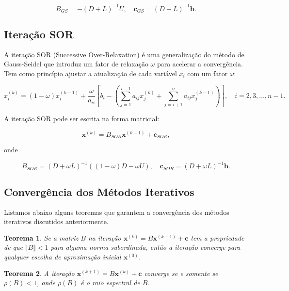 \documentclass{article}
\theoremstyle{plain}
\newtheorem{thm}{Teorema}[section]
\theoremstyle{definition}
\theoremstyle{remark}
\begin{document}
\begin{equation}
  B_{GS} = -(D + L)^{-1}U, \quad \mathbf{c}_{GS} = (D + L)^{-1}\mathbf{b}.
\end{equation}

\subsection{Iteração SOR}

A iteração SOR (Successive Over-Relaxation) é uma generalização do método de Gauss-Seidel que introduz um fator de relaxação \(\omega\) para acelerar a convergência. Tem como princípio ajustar a atualização de cada variável \(x_i\) com um fator \(\omega\):

\begin{equation}
  x_i^{(k)} = (1 - \omega)x_i^{(k-1)} + \frac{\omega}{a_{ii}} \left[ b_i - \left(\sum_{j=1}^{i-1} a_{ij} x_j^{(k)} + \sum_{j=i+1}^{n} a_{ij} x_j^{(k-1)}\right)\right], \quad i = 2, 3, \ldots, n-1.
\end{equation}

\noindent A iteração SOR pode ser escrita na forma matricial:

\begin{equation}
  \mathbf{x}^{(k)} = B_{SOR}\mathbf{x}^{(k-1)} + \mathbf{c}_{SOR},
\end{equation}

\noindent onde

\begin{equation}
  B_{SOR} = (D + \omega L)^{-1}((1 - \omega)D - \omega U), \quad \mathbf{c}_{SOR} = (D + \omega L)^{-1}\mathbf{b}.
\end{equation}

\subsection{Convergência dos Métodos Iterativos}

Listamos abaixo alguns teoremas que garantem a convergência dos métodos iterativos discutidos anteriormente.

\begin{thm}
  Se a matriz \(B\) na iteração \(\mathbf{x}^{(k)} = B\mathbf{x}^{(k-1)} + \mathbf{c}\) tem a propriedade de que \(\Vert B \Vert < 1\) para alguma norma subordinada, então a iteração converge para qualquer escolha de aproximação inicial \(\mathbf{x}^{(0)}\).
\end{thm}

\begin{thm}
  A iteração \(\mathbf{x}^{(k+1)} = B\mathbf{x}^{(k)} + \mathbf{c}\) converge se e somente se \(\rho(B) < 1\), onde \(\rho(B)\) é o raio espectral de \(B\).
\end{thm}
\end{document}
